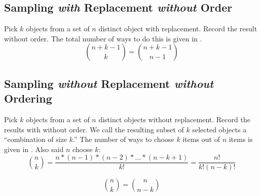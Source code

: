 	\subsection{Sampling \emph{with} Replacement \emph{without} Order} \label{subsec:Unordered Sampling with Replacement}
		\begin{definition} \label{def:Unordered Sampling without Replacement}
			Pick $k$ objects from a set of $n$ distinct object with replacement.
			Record the result without order.
			The total number of ways to do this is given in .
			\begin{equation} \label{eq:Unordered Sampling without Replacement}
				\binom{n+k-1}{k} = \binom{n+k-1}{n-1}
			\end{equation}
		\end{definition}
	
	\subsection{Sampling \emph{without} Replacement \emph{without} Ordering} \label{subsec:Unordered Sampling without Replacement}		
		\begin{definition} \label{def:Unordered Sampling with Replacement}
			Pick $k$ objects from a set of $n$ distinct objects without replacement.
			Record the results with without order.
			We call the resulting subset of $k$ selected objects a ``combination of size $k$.''
			The number of ways to choose $k$ items out of $n$ items is given in .
			Also said $n$ choose $k$:
			\begin{equation} \label{eq:Unordered Sampling with Replacement}
			\binom{n}{k} = \frac{n * (n-1) * (n-2) * \ldots * (n-k+1)}{k!} = \frac{n!}{k! \left( n-k \right)!}
			\end{equation}
		\end{definition}
		\begin{equation}
			\binom{n}{k} = \binom{n}{n-k}
		\end{equation}